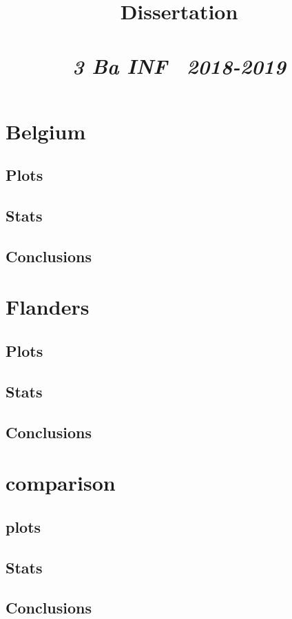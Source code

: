 \documentclass{article}
\title{\textmd{\textbf{Dissertation}}\\\normalsize\vspace{0.1in}\Large{\assignmentname}\\\vspace{0.1in}\small{\textit{3 Ba INF \  2018-2019}}}
\author{\studentA}
\date{}
\begin{document}
\maketitle


\section{Belgium}
\subsection{Plots}

\subsection{Stats}

\subsection{Conclusions}


\section{Flanders}
\subsection{Plots}

\subsection{Stats}

\subsection{Conclusions}

\section{comparison}
\subsection{plots}

\subsection{Stats}

\subsection{Conclusions}
\end{document}
